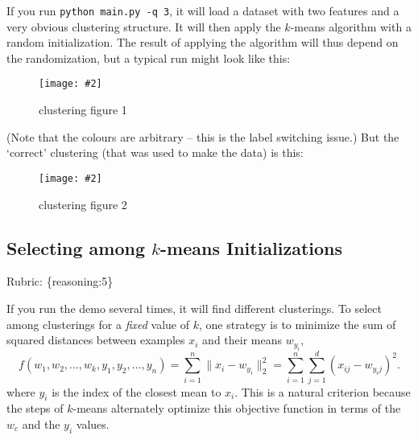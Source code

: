 \documentclass{article}
\def\gre#1{{\color{gre}#1}}
\def\norm#1{\|#1\|}
\newcommand{\centerfig}[2]{\begin{center}\texttt{[image: \#2]}\end{center}}
\def\rubric#1{\gre{Rubric: \{#1\}}}{}
\begin{document}
If you run \verb|python main.py -q 3|, it will load a dataset with two features
and a very obvious clustering structure. It will then apply the $k$-means algorithm
with a random initialization. The result of applying the
algorithm will thus depend on the randomization, but a typical run might look like this:
\begin{figure}[h!]
\centerfig{.5}{../figs/kmeans_basic.png}
\caption{clustering figure 1}
\end{figure}
(Note that the colours are arbitrary -- this is the label switching issue.)
But the `correct' clustering (that was used to make the data) is this:
\begin{figure}[h!]
\centerfig{.5}{../figs/kmeans_good.png}
\caption{clustering figure 2}
\end{figure}
\subsection{Selecting among $k$-means Initializations}
\rubric{reasoning:5}

If you run the demo several times, it will find different clusterings. To select among clusterings for a \emph{fixed} value of $k$, one strategy is to minimize the sum of squared distances between examples $x_i$ and their means $w_{y_i}$,
\[
f(w_1,w_2,\dots,w_k,y_1,y_2,\dots,y_n) = \sum_{i=1}^n \norm{x_i - w_{y_i}}_2^2 = \sum_{i=1}^n \sum_{j=1}^d (x_{ij} - w_{y_ij})^2.
\]
 where $y_i$ is the index of the closest mean to $x_i$. This is a natural criterion because the steps of $k$-means alternately optimize this objective function in terms of the $w_c$ and the $y_i$ values.
\end{document}
